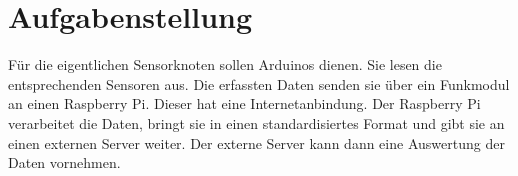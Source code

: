 \section{Aufgabenstellung}
Für die eigentlichen Sensorknoten sollen Arduinos dienen. Sie lesen die entsprechenden Sensoren aus. Die erfassten Daten senden sie über ein Funkmodul an einen Raspberry Pi. Dieser hat eine Internetanbindung. Der Raspberry Pi verarbeitet die Daten, bringt sie in einen standardisiertes Format und gibt sie an einen externen Server weiter. Der  externe Server kann dann eine Auswertung der Daten vornehmen. 